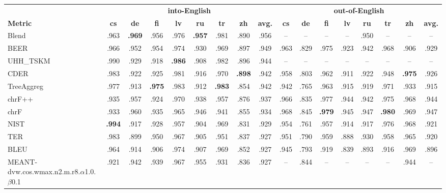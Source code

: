 \begin{landscape}
\begin{table}
\begin{tabular}{m{}cccccccc|cccccccc}
\hline & \multicolumn{8}{c|}{\textbf{into-English}} & \multicolumn{8}{c}{\textbf{out-of-English}} \\\textbf{Metric} & \textbf{cs} & \textbf{de} & \textbf{fi} & \textbf{lv} & \textbf{ru} & \textbf{tr} & \textbf{zh} & \textbf{avg.} & \textbf{cs} & \textbf{de} & \textbf{fi} & \textbf{lv} & \textbf{ru} & \textbf{tr} & \textbf{zh} & \textbf{avg.} \\ \hline
Blend  & .963 & \textbf{.969} & .956 & .976 & \textbf{.957} & .981 & .890 & .956 & -- & -- & -- & -- & .950 & -- & -- & -- \\ \hline
BEER & .966 & .952 & .954 & .974 & .930 & .969 & .897 & .949 & .963 & .829 & .975 & .923 & .942 & .968 & .906 & .929 \\ \hline
UHH\_TSKM & .990 & .929 & .918 & \textbf{.986} & .908 & .982  & .896  & .944  & --  & --  & --  & --  & --  & --  & --  & --  \\ \hline
CDER & .983  & .922  & .925  & .981  & .916  & .970  & \textbf{.898 } & .942  & .958  & .803  & .962  & .911  & .922  & .948  & \textbf{.975 } & .926  \\ \hline
TreeAggreg & .977  & .913  & \textbf{.975} & .983  & .912  & \textbf{.983 } & .854  & .942  & .942  & .765  & .963  & .915  & .919  & .971  & .933  & .915  \\ \hline
chrF++ & .935  & .957  & .924  & .970  & .938  & .957  & .876  & .937  & .966  & .835  & .977  & .944  & .942  & .975  & .968  & .944  \\ \hline
chrF & .933  & .960  & .935  & .965  & .946  & .941  & .855  & .934  & .968  & .845  & \textbf{.979 } & .945  & .947  & \textbf{.980 } & .969  & .947  \\ \hline
NIST & \textbf{.994} & .917  & .928  & .957  & .904  & .969  & .831  & .929  & .954  & .761  & .957  & .914  & .917  & .976  & .968  & .921  \\ \hline
TER & .983  & .899  & .950  & .967  & .905  & .951  & .837  & .927  & .951  & .790  & .959 & .888 & .930 & .958 & .965 & .920 \\ \hline
BLEU & .964  & .914  & .906  & .974  & .907  & .969  & .852  & .927  & .945  & .793  & .919  & .839  & .893  & .916  & .969  & .896  \\ \hline
MEANT-dvw.cos.wmax.n2.m.r8.$\alpha $1.0.$\beta $0.1 & .921  & .942  & .939  & .967  & .955  & .931  & .836  & .927  & --  & .844  & --  & --  & --  & --  & .944  & --  \\ \hline

\end{tabular}
\end{table}
\end{landscape}
